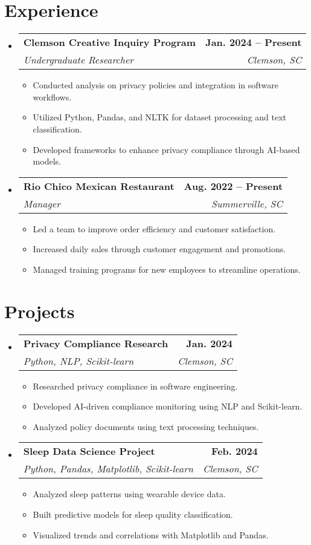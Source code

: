 \documentclass[letterpaper,11pt]{article}
\makeatletter
\newcommand{\resumeSubheading}[4]{
  \vspace{-2pt}\item[]
    \begin{tabular*}{1.0\textwidth}[t]{l@{\extracolsep{\fill}}r}
      \textbf{#1} & \textbf{\small #2} \\
      \textit{\small#3} & \textit{\small #4} \\
    \end{tabular*}\vspace{-7pt}
}
\makeatother
\begin{document}
\section{Experience}
\begin{itemize}
    \resumeSubheading{Clemson Creative Inquiry Program}{Jan. 2024 -- Present}{Undergraduate Researcher}{Clemson, SC}
    \begin{itemize}
        \item Conducted analysis on privacy policies and integration in software workflows.
        \item Utilized Python, Pandas, and NLTK for dataset processing and text classification.
        \item Developed frameworks to enhance privacy compliance through AI-based models.
    \end{itemize}

    \resumeSubheading{Rio Chico Mexican Restaurant}{Aug. 2022 -- Present}{Manager}{Summerville, SC}
    \begin{itemize}
        \item Led a team to improve order efficiency and customer satisfaction.
        \item Increased daily sales through customer engagement and promotions.
        \item Managed training programs for new employees to streamline operations.
    \end{itemize}
\end{itemize}


\section{Projects}
\begin{itemize}
    \resumeSubheading{Privacy Compliance Research}{Jan. 2024}{Python, NLP, Scikit-learn}{Clemson, SC}
    \begin{itemize}
        \item Researched privacy compliance in software engineering.
        \item Developed AI-driven compliance monitoring using NLP and Scikit-learn.
        \item Analyzed policy documents using text processing techniques.
    \end{itemize}

    \resumeSubheading{Sleep Data Science Project}{Feb. 2024}{Python, Pandas, Matplotlib, Scikit-learn}{Clemson, SC}
    \begin{itemize}
        \item Analyzed sleep patterns using wearable device data.
        \item Built predictive models for sleep quality classification.
        \item Visualized trends and correlations with Matplotlib and Pandas.
    \end{itemize}
\end{itemize}
\end{document}
